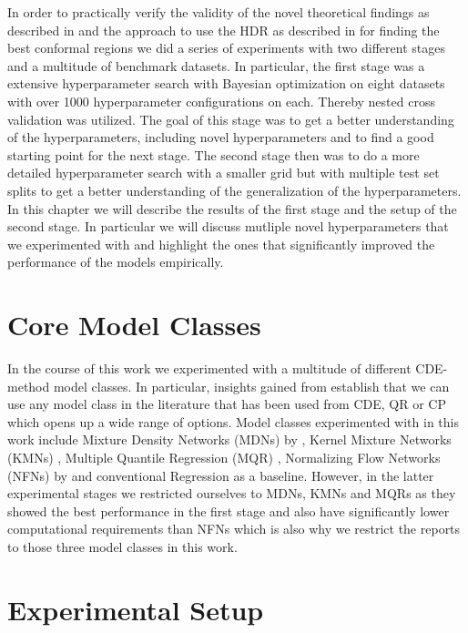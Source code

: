 In order to practically verify the validity of the novel theoretical findings as described in  and the approach to use the HDR as described in  for finding the best conformal regions we did a series of experiments with two different stages and a multitude of benchmark datasets. In particular, the first stage was a extensive hyperparameter search with Bayesian optimization on eight datasets with over 1000 hyperparameter configurations on each. Thereby nested cross validation was utilized. The goal of this stage was to get a better understanding of the hyperparameters, including novel hyperparameters and to find a good starting point for the next stage. The second stage then was to do a more detailed hyperparameter search with a smaller grid but with multiple test set splits to get a better understanding of the generalization of the hyperparameters. In this chapter we will describe the results of the first stage and the setup of the second stage. In particular we will discuss mutliple novel hyperparameters that we experimented with and highlight the ones that significantly improved the performance of the models empirically.

\section{Core Model Classes}\label{sec:core_model_classes}

In the course of this work we experimented with a multitude of different CDE-method model classes. In particular, insights gained from  establish that we can use any model class in the literature that has been used from CDE, QR or CP which opens up a wide range of options. Model classes experimented with in this work include Mixture Density Networks (MDNs) by \cite{bishop1994mixture}, Kernel Mixture Networks (KMNs) \cite{ambrogioni2017kernel}, Multiple Quantile Regression (MQR) \cite{gupta2022nested,moon2021learning}, Normalizing Flow Networks (NFNs) by \cite{trippe2018conditional} and conventional Regression as a baseline. However, in the latter experimental stages we restricted ourselves to MDNs, KMNs and MQRs as they showed the best performance in the first stage and also have significantly lower computational requirements than NFNs which is also why we restrict the reports to those three model classes in this work.

\section{Experimental Setup}\label{sec:experimental_setup}

